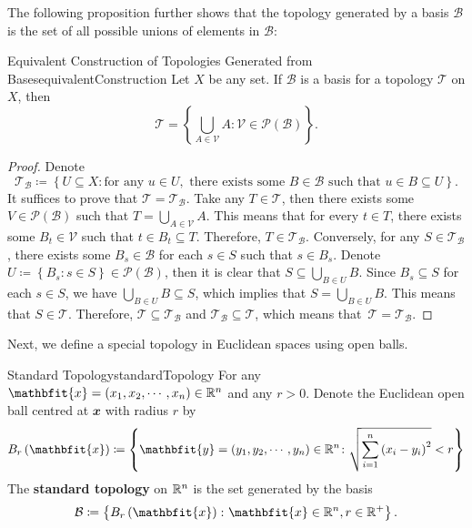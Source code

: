 \documentclass[math]{amznotes}
\theoremstyle{remark}
\begin{document}
The following proposition further shows that the topology generated by a basis $\mathcal{B}$ is the set of all possible unions of elements in $\mathcal{B}$:
\begin{probox}{\small Equivalent Construction of Topologies Generated from Bases}{equivalentConstruction}
    Let $X$ be any set. If $\mathcal{B}$ is a basis for a topology $\mathcal{T}$ on $X$, then 
    \begin{equation*}
        \mathcal{T} = \left\{\bigcup_{A \in \mathcal{V}} A  \colon \mathcal{V}\in \mathcal{P}\left(\mathcal{B}\right)\right\}.
    \end{equation*}
    \tcblower
    \begin{proof}
        Denote 
        \begin{equation*}
            \mathcal{T}_{\mathcal{B}} \coloneqq \left\{U \subseteq X \colon \textrm{for any } u \in U, \textrm{ there exists some } B \in \mathcal{B} \textrm{ such that } u \in B \subseteq U\right\}.
        \end{equation*}
        It suffices to prove that $\mathcal{T} = \mathcal{T}_{\mathcal{B}}$. Take any $T \in \mathcal{T}$, then there exists some $V \in \mathcal{P}\left(\mathcal{B}\right)$ such that $T = \bigcup_{A \in \mathcal{V}}A$. This means that for every $t \in T$, there exists some $B_t \in \mathcal{V}$ such that $t \in B_t \subseteq T$. Therefore, $T \in \mathcal{T}_{\mathcal{B}}$. Conversely, for any $S \in \mathcal{T}_{\mathcal{B}}$, there exists some $B_s \in \mathcal{B}$ for each $s \in S$ such that $s \in B_s$. Denote $U \coloneqq \left\{B_s \colon s \in S\right\} \in \mathcal{P}\left(\mathcal{B}\right)$, then it is clear that $S \subseteq \bigcup_{B \in U}B$. Since $B_s \subseteq S$ for each $s \in S$, we have $\bigcup_{B \in U}B \subseteq S$, which implies that $S = \bigcup_{B \in U}B$. This means that $S \in \mathcal{T}$. Therefore, $\mathcal{T} \subseteq \mathcal{T}_{\mathcal{B}}$ and $\mathcal{T}_{\mathcal{B}} \subseteq \mathcal{T}$, which means that~$\mathcal{T} = \mathcal{T}_{\mathcal{B}}$.
    \end{proof}
\end{probox}
Next, we define a special topology in Euclidean spaces using open balls.
\begin{dfnbox}{Standard Topology}{standardTopology}
    For any $\mathbfit{x} = \left(x_1, x_2, \cdots, x_n\right) \in \R^n$ and any $r > 0$. Denote the Euclidean open ball centred at $\mathbfit{x}$ with radius $r$ by
    \begin{equation*}
        B_{r}\left(\mathbfit{x}\right) \coloneqq \left\{\mathbfit{y} = \left(y_1, y_2, \cdots, y_n\right) \in \R^n \colon \sqrt{\sum_{i = 1}^{n}\left(x_i - y_i\right)^2} < r\right\}
    \end{equation*} 
    The {\color{red} \textbf{standard topology}} on $\mathbb{R}^n$ is the set generated by the basis
    \begin{equation*}
        \mathcal{B} \coloneqq \left\{B_{r}\left(\mathbfit{x}\right) \colon \mathbfit{x} \in \R^n, r \in \R^+\right\}.
    \end{equation*}
\end{dfnbox}
\end{document}

